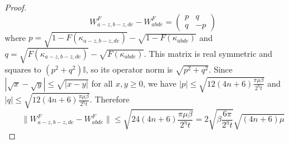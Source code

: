 \documentclass[aps,floatfix,10pt,amssymb,amsfont,amsmath,superscriptaddress,float,nofootinbib,longbibliography,nobalancelastpage,twocolumn]{revtex4-2}
\begin{document}
\begin{proof}
\begin{equation}
    W^F_{a-z,b-z,de}-W^F_{abde}=\begin{pmatrix} p & q\\ q & -p\end{pmatrix}
\end{equation}
where $p=\sqrt{1-F(\kappa_{a-z,b-z,de})}-\sqrt{1-F(\kappa_{abde})}$ and $q=\sqrt{F(\kappa_{a-z,b-z,de})}-\sqrt{F(\kappa_{abde})}$. This matrix is real symmetric and squares to $(p^2+q^2)\mathbb{I}$, so its operator norm is $\sqrt{p^2+q^2}$. Since $|\sqrt{x}-\sqrt{y}|\le\sqrt{|x-y|}$ for all $x,y\ge 0$, we have $|p|\leq \sqrt{12(4n+6)\frac{\pi\mu\beta}{2^{\eta}t}}$ and $|q|\leq \sqrt{12(4n+6)\frac{\pi\mu\beta}{2^{\eta}t}}$. Therefore
\begin{equation}
    \|W^F_{a-z,b-z,de}-W^F_{abde}\|\le\sqrt{24(4n+6)\frac{\pi\mu\beta}{2^{\eta}t}}
    =2\sqrt{\beta\frac{6\pi}{2^{\eta}t}}\sqrt{(4n+6)\mu}
\end{equation}
\end{proof}
\clearpage
\end{document}
